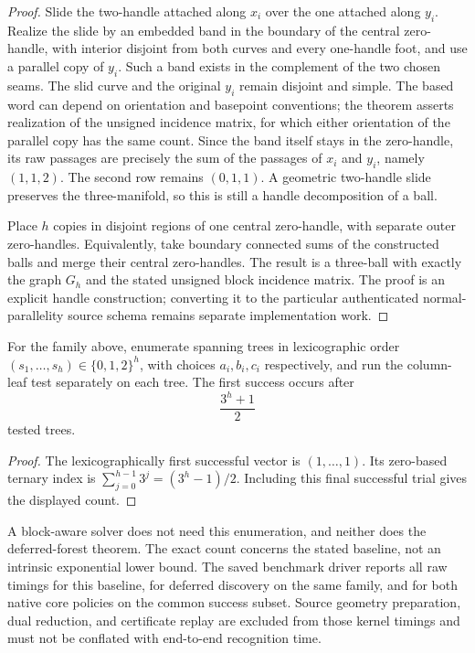\begin{proof}
Slide the two-handle attached along $x_i$ over the one attached along
$y_i$.  Realize the slide by an embedded band in the boundary of the
central zero-handle, with interior disjoint from both curves and every
one-handle foot, and use a parallel copy of $y_i$.  Such a band exists in
the complement of the two chosen seams.  The slid curve and the original
$y_i$ remain disjoint and simple.  The based word can depend on orientation and basepoint conventions;
the theorem asserts realization of the unsigned incidence matrix, for
which either orientation of the parallel copy has the same count.  Since
the band itself stays in the zero-handle, its raw passages are precisely
the sum of the passages of $x_i$ and $y_i$, namely $(1,1,2)$.  The second
row remains $(0,1,1)$.  A geometric two-handle slide preserves the
three-manifold, so this is still a handle decomposition of a ball.

Place $h$ copies in disjoint regions of one central zero-handle, with
separate outer zero-handles.  Equivalently, take boundary connected sums
of the constructed balls and merge their central zero-handles.  The
result is a three-ball with exactly the graph $G_h$ and the stated
unsigned block incidence matrix.  The proof is an explicit handle
construction; converting it to the particular authenticated
normal-parallelity source schema remains separate implementation work.
\end{proof}

\begin{proposition}
For the family above, enumerate spanning trees in lexicographic order
$(s_1,\ldots,s_h)\in\{0,1,2\}^h$, with choices $a_i,b_i,c_i$ respectively,
and run the column-leaf test separately on each tree.  The first success
occurs after
\[
 \frac{3^h+1}{2}
\]
tested trees.
\end{proposition}
\begin{proof}
The lexicographically first successful vector is $(1,\ldots,1)$.  Its
zero-based ternary index is
$\sum_{j=0}^{h-1}3^j=(3^h-1)/2$.  Including this final successful trial
gives the displayed count.
\end{proof}

A block-aware solver does not need this enumeration, and neither does
the deferred-forest theorem.  The exact count concerns the stated
baseline, not an intrinsic exponential lower bound.  The saved benchmark
driver reports all raw timings for this baseline, for deferred discovery
on the same family, and for both native core policies on the common
success subset.  Source geometry preparation, dual reduction, and
certificate replay are excluded from those kernel timings and must not
be conflated with end-to-end recognition time.
